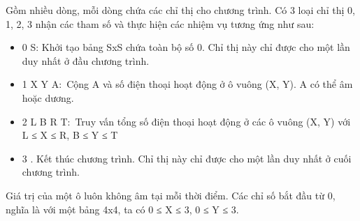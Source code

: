 Gồm nhiều dòng, mỗi dòng chứa các chỉ thị cho chương trình. Có 3 loại chỉ thị 0, 1, 2, 3 nhận các tham số và thực hiện các nhiệm vụ tương ứng như sau:
\begin{itemize}
	\item 0 S: Khởi tạo bảng SxS chứa toàn bộ số 0. Chỉ thị này chỉ được cho một lần duy nhất ở đầu chương trình.
	\item 1 X Y A: Cộng A và số điện thoại hoạt động ở ô vuông (X, Y). A có thể âm hoặc dương.
	\item 2 L B R T: Truy vấn tổng số điện thoại hoạt động ở các ô vuông (X, Y) với L ≤ X ≤ R, B ≤ Y ≤ T
	\item 3 . Kết thúc chương trình. Chỉ thị này chỉ được cho một lần duy nhất ở cuối chương trình.
\end{itemize}

Giá trị của một ô luôn không âm tại mỗi thời điểm. Các chỉ số bắt đầu từ 0, nghĩa là với một bảng 4x4, ta có 0 ≤ X ≤ 3, 0 ≤ Y ≤ 3.